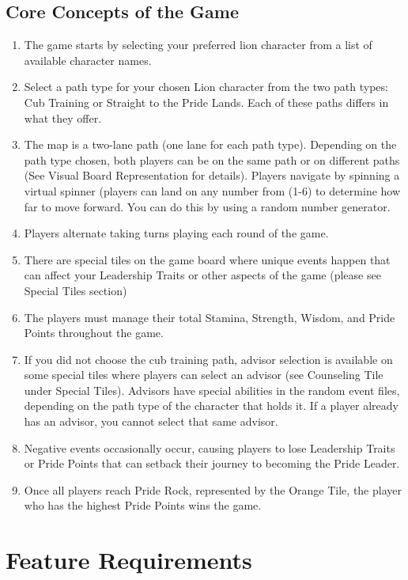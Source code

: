 \subsection{Core Concepts of the Game}
\begin{enumerate}
    \item The game starts by selecting your preferred lion character from a list of available character names.
    \item Select a path type for your chosen Lion character from the two path types: Cub Training or Straight to the Pride Lands. Each of these paths differs in what they offer.
    \item The map is a two-lane path (one lane for each path type). Depending on the path type chosen, both players can be on the same path or on different paths (See Visual Board Representation for details). Players navigate by spinning a virtual spinner (players can land on any number from (1-6) to determine how far to move forward. You can do this by using a random number generator.
    \item Players alternate taking turns playing each round of the game.
    \item There are special tiles on the game board where unique events happen that can affect your Leadership Traits or other aspects of the game (please see Special Tiles section)
    \item The players must manage their total Stamina, Strength, Wisdom, and Pride Points throughout the game.
    \item If you did not choose the cub training path, advisor selection is available on some special tiles where players can select an advisor (see Counseling Tile under Special Tiles). Advisors have special abilities in the random event files, depending on the path type of the character that holds it. If a player already has an advisor, you cannot select that same advisor. 
    \item Negative events occasionally occur, causing players to lose Leadership Traits or Pride Points that can setback their journey to becoming the Pride Leader.
    \item Once all players reach Pride Rock, represented by the Orange Tile, the player who has the highest Pride Points wins the game.
\end{enumerate}
 

 
\section{\textbf{Feature Requirements}}

